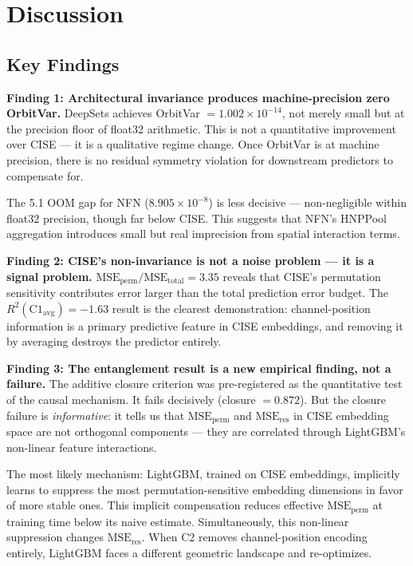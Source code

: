 \section{Discussion}
\label{sec:discussion}

\subsection{Key Findings}

\textbf{Finding 1: Architectural invariance produces machine-precision zero OrbitVar.} DeepSets achieves OrbitVar $= 1.002 \times 10^{-14}$, not merely small but at the precision floor of float32 arithmetic. This is not a quantitative improvement over CISE --- it is a qualitative regime change. Once OrbitVar is at machine precision, there is no residual symmetry violation for downstream predictors to compensate for.

The 5.1 OOM gap for NFN ($8.905 \times 10^{-8}$) is less decisive --- non-negligible within float32 precision, though far below CISE. This suggests that NFN's HNPPool aggregation introduces small but real imprecision from spatial interaction terms.

\textbf{Finding 2: CISE's non-invariance is not a noise problem --- it is a signal problem.} $\text{MSE}_\text{perm}/\text{MSE}_\text{total} = 3.35$ reveals that CISE's permutation sensitivity contributes error larger than the total prediction error budget. The $R^2(\text{C1}_\text{avg}) = -1.63$ result is the clearest demonstration: channel-position information is a primary predictive feature in CISE embeddings, and removing it by averaging destroys the predictor entirely.

\textbf{Finding 3: The entanglement result is a new empirical finding, not a failure.} The additive closure criterion was pre-registered as the quantitative test of the causal mechanism. It fails decisively (closure $= 0.872$). But the closure failure is \emph{informative}: it tells us that $\text{MSE}_\text{perm}$ and $\text{MSE}_\text{res}$ in CISE embedding space are not orthogonal components --- they are correlated through LightGBM's non-linear feature interactions.

The most likely mechanism: LightGBM, trained on CISE embeddings, implicitly learns to suppress the most permutation-sensitive embedding dimensions in favor of more stable ones. This implicit compensation reduces effective $\text{MSE}_\text{perm}$ at training time below its naive estimate. Simultaneously, this non-linear suppression changes $\text{MSE}_\text{res}$. When C2 removes channel-position encoding entirely, LightGBM faces a different geometric landscape and re-optimizes.


